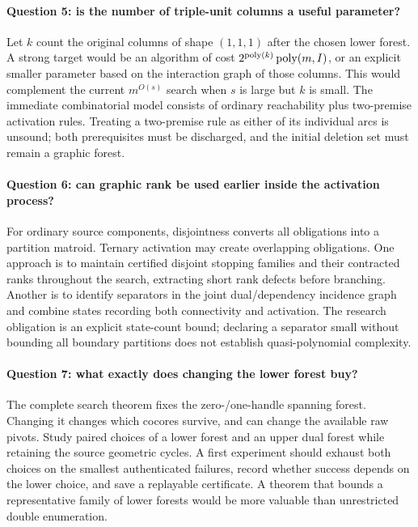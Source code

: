 \paragraph{Question 5: is the number of triple-unit columns a useful
parameter?}
Let $k$ count the original columns of shape $(1,1,1)$ after the chosen
lower forest.  A strong target would be an algorithm of cost
$2^{\operatorname{poly}(k)}\operatorname{poly}(m,I)$, or an explicit smaller parameter based on the
interaction graph of those columns.  This would complement the current
$m^{O(s)}$ search when $s$ is large but $k$ is small.  The immediate
combinatorial model consists of ordinary reachability plus two-premise
activation rules.  Treating a two-premise rule as either of its individual
arcs is unsound; both prerequisites must be discharged, and the initial
deletion set must remain a graphic forest.

\paragraph{Question 6: can graphic rank be used earlier inside the
activation process?}
For ordinary source components, disjointness converts all obligations
into a partition matroid.  Ternary activation may create overlapping
obligations.  One approach is to maintain certified disjoint stopping
families and their contracted ranks throughout the search, extracting
short rank defects before branching.  Another is to identify separators
in the joint dual/dependency incidence graph and combine states recording
both connectivity and activation.  The research obligation is an explicit
state-count bound; declaring a separator small without bounding all
boundary partitions does not establish quasi-polynomial complexity.

\paragraph{Question 7: what exactly does changing the lower forest buy?}
The complete search theorem fixes the zero-/one-handle spanning forest.
Changing it changes which cocores survive, and can change the available
raw pivots.  Study paired choices of a lower forest and an upper dual
forest while retaining the source geometric cycles.  A first experiment
should exhaust both choices on the smallest authenticated failures,
record whether success depends on the lower choice, and save a replayable
certificate.  A theorem that bounds a representative family of lower
forests would be more valuable than unrestricted double enumeration.

